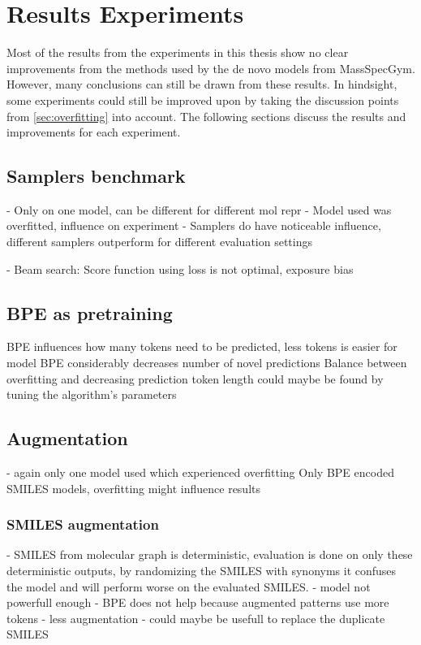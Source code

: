 \section{Results Experiments}

Most of the results from the experiments in this thesis show no clear improvements from the methods used by the de novo models from MassSpecGym.
However, many conclusions can still be drawn from these results.
In hindsight, some experiments could still be improved upon by taking the discussion points from \ref{sec:overfitting} into account.
The following sections discuss the results and improvements for each experiment.

\subsection{Samplers benchmark}

- Only on one model, can be different for different mol repr
- Model used was overfitted, influence on experiment
- Samplers do have noticeable influence, different samplers outperform for different evaluation settings

- Beam search: Score function using loss is not optimal, exposure bias

\subsection{\ac{BPE} as pretraining}

BPE influences how many tokens need to be predicted, less tokens is easier for model
BPE considerably decreases number of novel predictions
Balance between overfitting and decreasing prediction token length could maybe be found by tuning the algorithm's parameters


\subsection{Augmentation}

- again only one model used which experienced overfitting
Only BPE encoded SMILES models, overfitting might influence results

\subsubsection*{SMILES augmentation}
- SMILES from molecular graph is deterministic, evaluation is done on only these deterministic outputs, by randomizing the SMILES with synonyms it confuses the model and will perform worse on the evaluated SMILES.
- model not powerfull enough
- BPE does not help because augmented patterns use more tokens
- less augmentation
- could maybe be usefull to replace the duplicate SMILES

